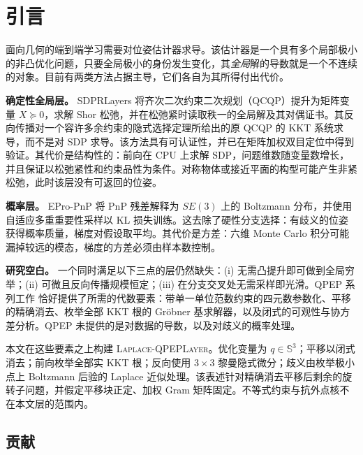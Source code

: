 \section{引言}\label{sec:intro}

面向几何的端到端学习需要对位姿估计器求导。该估计器是一个具有多个局部极小的非凸优化问题，只要全局极小的身份发生变化，其\emph{全局}解的导数就是一个不连续的对象。目前有两类方法占据主导，它们各自为其所得付出代价。

\textbf{确定性全局层。} SDPRLayers \cite{holmes2025sdpr} 将齐次二次约束二次规划（QCQP）提升为矩阵变量 $X\succeq0$，求解 Shor 松弛，并在松弛紧时读取秩一的全局解及其对偶证书。其反向传播对一个容许多余约束的隐式选择定理所给出的原 QCQP 的 KKT 系统求导，而不是对 SDP 求导。该方法具有可认证性，并已在矩阵加权双目定位中得到验证。其代价是结构性的：前向在 CPU 上求解 SDP，问题维数随变量数增长，并且保证以松弛紧性和约束品性为条件。对称物体或接近平面的构型可能产生非紧松弛，此时该层没有可返回的位姿。

\textbf{概率层。} EPro-PnP \cite{chen2022epropnp} 将 PnP 残差解释为 $SE(3)$ 上的 Boltzmann 分布，并使用自适应多重重要性采样以 KL 损失训练。这去除了硬性分支选择：有歧义的位姿获得概率质量，梯度对假设取平均。其代价是方差：六维 Monte Carlo 积分可能漏掉较远的模态，梯度的方差必须由样本数控制。

\textbf{研究空白。} 一个同时满足以下三点的层仍然缺失：(i) 无需凸提升即可做到全局穷举；(ii) 可微且反向传播规模恒定；(iii) 在分支交叉处无需采样即光滑。QPEP 系列工作 \cite{wu2022qpep} 恰好提供了所需的代数要素：带单一单位范数约束的四元数参数化、平移的精确消去、枚举全部 KKT 根的 Gr\"obner 基求解器，以及闭式的可观性与协方差分析。QPEP 未提供的是对数据的导数，以及对歧义的概率处理。

本文在这些要素之上构建 \textsc{Laplace-QPEPLayer}。优化变量为 $q\in\mathbb{S}^3$；平移以闭式消去；前向枚举全部实 KKT 根；反向使用 $3\times3$ 黎曼隐式微分；歧义由枚举极小点上 Boltzmann 后验的 Laplace 近似处理。该表述针对精确消去平移后剩余的旋转子问题，并假定平移块正定、加权 Gram 矩阵固定。不等式约束与抗外点核不在本文层的范围内。

\subsection{贡献}

